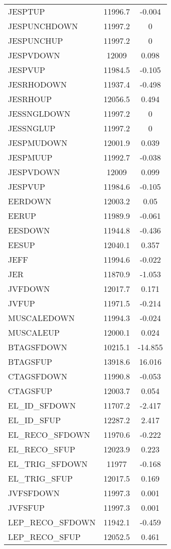 \begin{center}
\begin{longtable}{|l|c|c|}
JESPTUP & 11996.7 & -0.004 \\
JESPUNCHDOWN & 11997.2 & 0 \\
JESPUNCHUP & 11997.2 & 0 \\
JESPVDOWN & 12009 & 0.098 \\
JESPVUP & 11984.5 & -0.105 \\
JESRHODOWN & 11937.4 & -0.498 \\
JESRHOUP & 12056.5 & 0.494 \\
JESSNGLDOWN & 11997.2 & 0 \\
JESSNGLUP & 11997.2 & 0 \\
JESPMUDOWN & 12001.9 & 0.039 \\
JESPMUUP & 11992.7 & -0.038 \\
JESPVDOWN & 12009 & 0.099 \\
JESPVUP & 11984.6 & -0.105 \\
\hline
EERDOWN & 12003.2 & 0.05 \\
EERUP & 11989.9 & -0.061 \\
EESDOWN & 11944.8 & -0.436 \\
EESUP & 12040.1 & 0.357 \\
JEFF & 11994.6 & -0.022 \\
JER & 11870.9 & -1.053 \\
JVFDOWN & 12017.7 & 0.171 \\
JVFUP & 11971.5 & -0.214 \\
MUSCALEDOWN & 11994.3 & -0.024 \\
MUSCALEUP & 12000.1 & 0.024 \\
\hline
BTAGSFDOWN  & 10215.1 & -14.855 \\
BTAGSFUP  & 13918.6 & 16.016 \\
CTAGSFDOWN  & 11990.8 & -0.053 \\
CTAGSFUP  & 12003.7 & 0.054 \\
EL\_ID\_SFDOWN  & 11707.2 & -2.417 \\
EL\_ID\_SFUP  & 12287.2 & 2.417 \\
EL\_RECO\_SFDOWN  & 11970.6 & -0.222 \\
EL\_RECO\_SFUP  & 12023.9 & 0.223 \\
EL\_TRIG\_SFDOWN  & 11977 & -0.168 \\
EL\_TRIG\_SFUP  & 12017.5 & 0.169 \\
JVFSFDOWN  & 11997.3 & 0.001 \\
JVFSFUP  & 11997.3 & 0.001 \\
LEP\_RECO\_SFDOWN  & 11942.1 & -0.459 \\
LEP\_RECO\_SFUP  & 12052.5 & 0.461 \\

\end{longtable}
\end{center}
